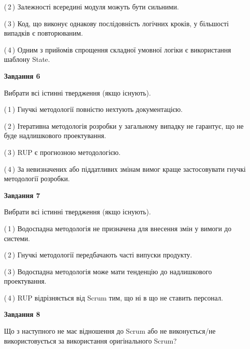 \documentclass[10pt, ukrainian]{article}
\begin{document}
{\begin {large}
(\,2\,) Залежності всередині модуля можуть бути сильними. %



(\,3\,) Код, що виконує однакову послідовність логічних кроків, у більшості випадків є повторюваним.%



(\,4\,) Одним з прийомів спрощення складної умовної логіки є використання шаблону State. %

\newpage

{\begin {center}\textbf{Завдання 6}\end {center}}\par
Вибрати всі істинні твердження (якщо існують).\par
\vspace{2mm}



(\,1\,) Гнучкі методології повністю нехтують документацією. %



(\,2\,) Ітеративна методологія розробки у загальному випадку не гарантує, що не буде надлишкового проектування. %



(\,3\,) RUP є прогнозною методологією. %



(\,4\,) За невизначених або піддатливих змінам вимог краще застосовувати гнучкі методології розробки. %


{\begin {center}\textbf{Завдання 7}\end {center}}\par
Вибрати всі істинні твердження (якщо існують).\par
\vspace{2mm}



(\,1\,) Водоспадна методологія не призначена для внесення змін у вимоги до системи. %



(\,2\,) Гнучкі методології передбачають часті випуски продукту. %



(\,3\,) Водоспадна методологія може мати тенденцію до надлишкового проектування. %



(\,4\,) RUP відрізняється від Scrum тим, що ні в що не ставить персонал.%


{\begin {center}\textbf{Завдання 8}\end {center}}\par
Що з наступного не має відношення до Scrum або не виконується/не використовується за використання оригінального Scrum?\par
\vspace{2mm}




\end{large}}
\end{document}
